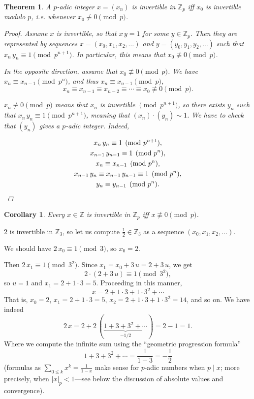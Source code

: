 \documentclass{article}
\newcommand{\ZZ}{\mathbb{Z}}
\newcommand{\examplesymbol}{$\blacktriangle$}
\renewcommand{\qedsymbol}{$\blacksquare$}
\theoremstyle{myplain}
\newtheorem{theorem}[proposition]{Theorem}
\newtheorem{corollary}[proposition]{Corollary}
\theoremstyle{mydefinition}
\newenvironment{example}
  {\pushQED{\qed}\renewcommand{\qedsymbol}{\examplesymbol}\examplex}
  {\popQED\endexamplex}
\begin{document}
\begin{theorem}
  A $p$-adic integer $x = (x_n)$ is invertible in $\ZZ_p$ iff $x_0$ is
  invertible modulo $p$, i.e. whenever $x_0 \not\equiv 0 \pmod{p}$.

\begin{proof}
  Assume $x$ is invertible, so that $x\,y = 1$ for some $y \in \ZZ_p$. Then they
  are represented by sequences $x = (x_0,x_1,x_2,\ldots)$ and
  $y = (y_0,y_1,y_2,\ldots)$ such that $x_n\,y_n \equiv 1 \pmod{p^{n+1}}$.
  In particular, this means that $x_0 \not\equiv 0 \pmod{p}$.

  In the opposite direction, assume that $x_0 \not\equiv 0 \pmod{p}$. We have
  $x_n \equiv x_{n-1} \pmod{p^n}$, and thus $x_n \equiv x_{n-1} \pmod{p}$,
  \[ x_n \equiv x_{n-1} \equiv x_{n-2} \equiv \cdots \equiv x_0 \not\equiv 0 \pmod{p}. \]

  $x_n \not\equiv 0 \pmod{p}$ means that $x_n$ is invertible $\pmod{p^{n+1}}$,
  so there exists $y_n$ such that $x_n\,y_n \equiv 1 \pmod{p^{n+1}}$, meaning
  that $(x_n) \cdot (y_n) \sim 1$. We have to check that $(y_n)$ gives a
  $p$-adic integer. Indeed,

  \begin{gather*}
    x_n\,y_n \equiv 1 \pmod{p^{n+1}},\\
    x_{n-1}\,y_{n-1} \equiv 1 \pmod{p^n},\\
    x_n \equiv x_{n-1} \pmod{p^n},\\
    x_{n-1}\,y_n \equiv x_{n-1}\,y_{n-1} \equiv 1 \pmod{p^n},\\
    y_n \equiv y_{n-1} \pmod{p^n}. \qedhere
  \end{gather*}
\end{proof}
\end{theorem}

\begin{corollary}
  Every $x \in \ZZ$ is invertible in $\ZZ_p$ iff $x \not\equiv 0 \pmod{p}$.
\end{corollary}

\begin{example}
  $2$ is invertible in $\ZZ_3$, so let us compute $\frac{1}{2} \in \ZZ_3$ as a
  sequence $(x_0, x_1, x_2, \ldots)$.

  We should have $2\,x_0 \equiv 1 \pmod{3}$, so $x_0 = 2$.

  Then $2\,x_1 \equiv 1 \pmod{3^2}$. Since $x_1 = x_0 + 3\,u = 2 + 3\,u$, we get
  $$2 \cdot (2 + 3\,u) \equiv 1 \pmod{3^2},$$
  so $u = 1$ and $x_1 = 2 + 1\cdot 3 = 5$. Proceeding in this manner,
  $$x = 2 + 1\cdot 3 + 1\cdot 3^2 + \cdots$$
  That is, $x_0 = 2$, $x_1 = 2 + 1\cdot 3 = 5$,
  $x_2 = 2 + 1\cdot 3 + 1\cdot 3^2 = 14$, and so on. We have indeed
  $$2\,x = 2 + 2\,(\underbrace{1 + 3 + 3^2 + \cdots}_{-1/2}) = 2-1 = 1.$$
  Where we compute the infinite sum using the ``geometric progression formula''
  $$1 + 3 + 3^2 + \cdots = \frac{1}{1-3} = -\frac{1}{2}$$
  (formulas as $\sum\limits_{0 \le k} x^k = \frac{1}{1-x}$ make sense for
  $p$-adic numbers when $p \mid x$; more precisely, when $|x|_p < 1$---see below
  the discussion of absolute values and convergence).
\end{example}
\end{document}
